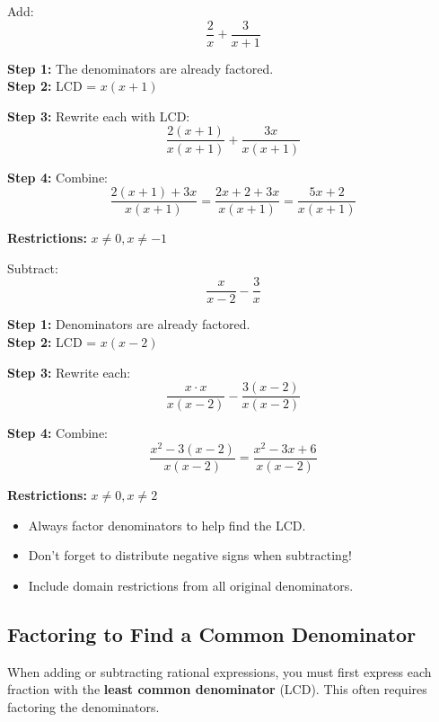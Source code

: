 \documentclass[11pt]{article}
\begin{document}
\begin{example}
Add:
\[
\frac{2}{x} + \frac{3}{x + 1}
\]

\textbf{Step 1:} The denominators are already factored. \\
\textbf{Step 2:} LCD = \( x(x + 1) \)

\textbf{Step 3:} Rewrite each with LCD:
\[
\frac{2(x + 1)}{x(x + 1)} + \frac{3x}{x(x + 1)}
\]

\textbf{Step 4:} Combine:
\[
\frac{2(x + 1) + 3x}{x(x + 1)} = \frac{2x + 2 + 3x}{x(x + 1)} = \frac{5x + 2}{x(x + 1)}
\]

\textbf{Restrictions:} \( x \neq 0, x \neq -1 \)

\end{example}

\begin{example}
Subtract:
\[
\frac{x}{x - 2} - \frac{3}{x}
\]

\textbf{Step 1:} Denominators are already factored. \\
\textbf{Step 2:} LCD = \( x(x - 2) \)

\textbf{Step 3:} Rewrite each:
\[
\frac{x \cdot x}{x(x - 2)} - \frac{3(x - 2)}{x(x - 2)}
\]

\textbf{Step 4:} Combine:
\[
\frac{x^2 - 3(x - 2)}{x(x - 2)} = \frac{x^2 - 3x + 6}{x(x - 2)}
\]

\textbf{Restrictions:} \( x \neq 0, x \neq 2 \)

\end{example}

\begin{tcolorbox}[colback=yellow!5!white, colframe=yellow!80!black, title=Note]
\begin{itemize}
  \item Always factor denominators to help find the LCD.
  \item Don’t forget to distribute negative signs when subtracting!
  \item Include domain restrictions from all original denominators.
\end{itemize}
\end{tcolorbox}

\subsection{Factoring to Find a Common Denominator}

When adding or subtracting rational expressions, you must first express each fraction with the \textbf{least common denominator} (LCD). This often requires factoring the denominators.
\end{document}
